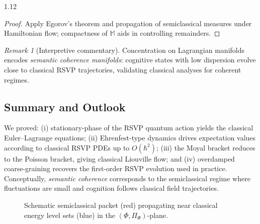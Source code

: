 \documentclass[12pt,a4paper]{article}
\numberwithin{equation}{section}
\theoremstyle{remark}
\newtheorem{remark}{Remark}[section]
\theoremstyle{definition}
\begin{document}
\begin{spacing}{1.12}
\begin{proof}
Apply Egorov's theorem and propagation of semiclassical measures under Hamiltonian flow; compactness of $\mathbb{M}$ aids in controlling remainders.
\end{proof}

\begin{remark}[Interpretive commentary]
Concentration on Lagrangian manifolds encodes \emph{semantic coherence manifolds}: cognitive states with low dispersion evolve close to classical RSVP trajectories, validating classical analyses for coherent regimes.
\end{remark}

\subsection{Summary and Outlook}\label{sec:D-summary}

We proved: (i) stationary-phase of the RSVP quantum action yields the classical Euler--Lagrange equations; (ii) Ehrenfest-type dynamics drives expectation values according to classical RSVP PDEs up to $O(\hbar^2)$; (iii) the Moyal bracket reduces to the Poisson bracket, giving classical Liouville flow; and (iv) overdamped coarse-graining recovers the first-order RSVP evolution used in practice. Conceptually, \emph{semantic coherence} corresponds to the semiclassical regime where fluctuations are small and cognition follows classical field trajectories.

\bigskip

\begin{figure}[h]
\centering
{}
\caption{Schematic semiclassical packet (red) propagating near classical energy level sets (blue) in the $(\Phi,\Pi_\Phi)$-plane.}
\end{figure}


\end{spacing}
\end{document}
